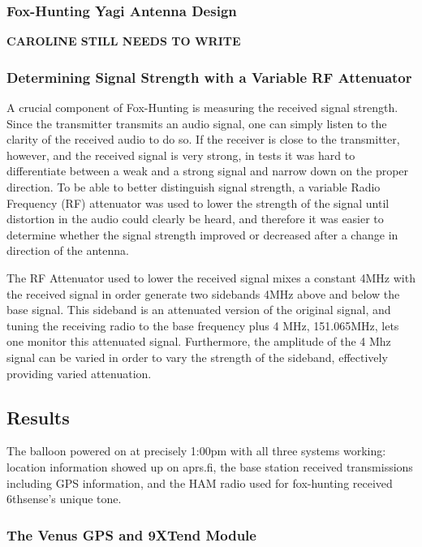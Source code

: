 \documentclass[12pt,]{article}
\begin{document}
\subsubsection{Fox-Hunting Yagi Antenna
Design}\label{fox-hunting-yagi-antenna-design}

\textbf{CAROLINE STILL NEEDS TO WRITE}

\subsubsection{Determining Signal Strength with a Variable RF
Attenuator}\label{determining-signal-strength-with-a-variable-rf-attenuator}

A crucial component of Fox-Hunting is measuring the received signal
strength. Since the transmitter transmits an audio signal, one can
simply listen to the clarity of the received audio to do so. If the
receiver is close to the transmitter, however, and the received signal
is very strong, in tests it was hard to differentiate between a weak and
a strong signal and narrow down on the proper direction. To be able to
better distinguish signal strength, a variable Radio Frequency (RF)
attenuator was used to lower the strength of the signal until distortion
in the audio could clearly be heard, and therefore it was easier to
determine whether the signal strength improved or decreased after a
change in direction of the antenna.

The RF Attenuator used to lower the received signal mixes a constant
4MHz with the received signal in order generate two sidebands 4MHz above
and below the base signal. This sideband is an attenuated version of the
original signal, and tuning the receiving radio to the base frequency
plus 4 MHz, 151.065MHz, lets one monitor this attenuated signal.
Furthermore, the amplitude of the 4 Mhz signal can be varied in order to
vary the strength of the sideband, effectively providing varied
attenuation.

\subsection{Results}\label{results}

The balloon powered on at precisely 1:00pm with all three systems
working: location information showed up on aprs.fi, the base station
received transmissions including GPS information, and the HAM radio used
for fox-hunting received 6thsense's unique tone.

\subsubsection{The Venus GPS and 9XTend
Module}\label{the-venus-gps-and-9xtend-module}
\end{document}
